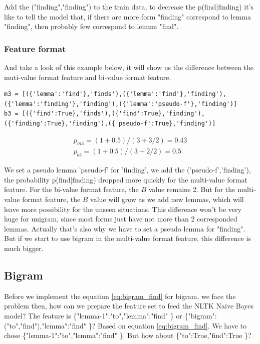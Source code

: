 \documentclass[a4paper]{article}
\begin{document}
Add the ("finding","finding") to the train data, to decrease the p(find|finding) it's like to tell the model that, if there are more form "finding" correspond to lemma "finding", then probably few correspond to lemma "find". 

\subsubsection{Feature format}
And take a look of this example below, it will show us the difference between the muti-value format feature and bi-value format feature. 

\begin{lstlisting}
m3 = [({'lemma':'find'},'finds'),({'lemma':'find'},'finding'), ({'lemma':'finding'},'finding'),({'lemma':'pseudo-f'},'finding')]
b3 = [({'find':True},'finds'),({'find':True},'finding'),
({'finding':True},'finding'),({'pseudo-f':True},'finding')]
\end{lstlisting}
\begin{align*}
p_{m3}=(1+0.5)/(3+3/2)=0.43 \\
p_{b3}=(1+0.5)/(3+2/2)=0.5 
\end{align*}


We set a pseudo lemma 'pseudo-f' for 'finding', we add the ('pseudo-f','finding'), the probability p(find|finding) dropped more quickly for the multi-value format feature. For the bi-value format feature, the $B$ value remains 2. But for the multi-value format feature, the $B$ value will grow as we add new lemmas, which will leave more possibility for the unseen situations. This difference won't be very huge for unigram, since most forms just have not more than 2 corresponded lemmas. Actually that's also why we have to set a pseudo lemma for "finding". But if we start to use bigram in the multi-value format feature, this difference is much bigger.

\subsection*{Bigram}

Before we implement the equation \ref{eq:bigram_find} for bigram, we face the problem then, how can we prepare the feature set to feed the NLTK Naive Bayes model? The feature is \{"lemma-1":"to","lemma":"find" \} or 
 \{"bigram":("to","find"),"lemma":"find" \}? Based on equation \ref{eq:bigram_find}. We have to chose \{"lemma-1":"to","lemma":"find" \}. But how about \{"to":True,"find":True \}?
\end{document}
